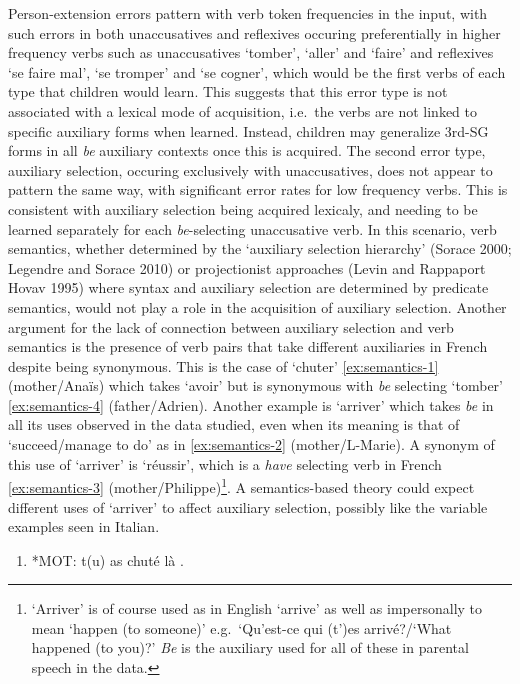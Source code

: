 \documentclass[
  12pt,
]{article}
\begin{document}
\begin{enumerate}[resume*]
\begin{enumerate}[resume*]
\begin{enumerate}[resume*]
\begin{enumerate}[resume*]
\begin{enumerate}[resume*]
Person-extension errors pattern with verb token frequencies in the input, with such errors in both unaccusatives and reflexives occuring preferentially in higher frequency verbs such as unaccusatives `tomber', `aller' and `faire' and reflexives `se faire mal', `se tromper' and `se cogner', which would be the first verbs of each type that children would learn. This suggests that this error type is not associated with a lexical mode of acquisition, i.e.~the verbs are not linked to specific auxiliary forms when learned. Instead, children may generalize 3rd-SG forms in all \emph{be} auxiliary contexts once this is acquired. The second error type, auxiliary selection, occuring exclusively with unaccusatives, does not appear to pattern the same way, with significant error rates for low frequency verbs. This is consistent with auxiliary selection being acquired lexicaly, and needing to be learned separately for each \emph{be}-selecting unaccusative verb. In this scenario, verb semantics, whether determined by the `auxiliary selection hierarchy' (Sorace 2000; Legendre and Sorace 2010) or projectionist approaches (Levin and Rappaport Hovav 1995) where syntax and auxiliary selection are determined by predicate semantics, would not play a role in the acquisition of auxiliary selection. Another argument for the lack of connection between auxiliary selection and verb semantics is the presence of verb pairs that take different auxiliaries in French despite being synonymous. This is the case of `chuter' \ref{ex:semantics-1} (mother/Anaïs) which takes `avoir' but is synonymous with \emph{be} selecting `tomber' \ref{ex:semantics-4} (father/Adrien). Another example is `arriver' which takes \emph{be} in all its uses observed in the data studied, even when its meaning is that of `succeed/manage to do' as in \ref{ex:semantics-2} (mother/L-Marie). A synonym of this use of `arriver' is `réussir', which is a \emph{have} selecting verb in French \ref{ex:semantics-3} (mother/Philippe)\footnote{`Arriver' is of course used as in English `arrive' as well as impersonally to mean `happen (to someone)' e.g.~`Qu'est-ce qui (t')es arrivé?/`What happened (to you)?' \emph{Be} is the auxiliary used for all of these in parental speech in the data.}. A semantics-based theory could expect different uses of `arriver' to affect auxiliary selection, possibly like the variable examples seen in Italian.

\begin{enumerate}[resume*]
  \item{*MOT:   t(u) as chuté là . \label{ex:semantics-1}}
    

\end{enumerate}
\end{enumerate}
\end{enumerate}
\end{enumerate}
\end{enumerate}
\end{enumerate}
\end{document}

